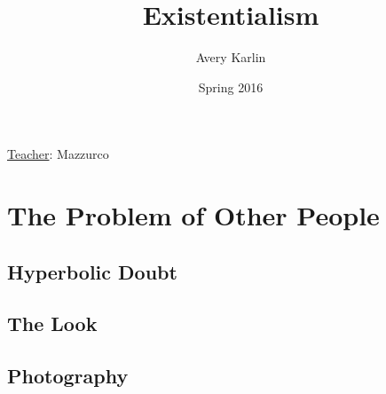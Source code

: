 \documentclass[11 pt, twoside]{article}
\newenvironment{outline*}
{
	\begin{outline}[enumerate]
	}
	{\end{outline}
}
\begin{document}
\title{Existentialism}
\author{Avery Karlin}
\date{Spring 2016}
\newcommand{\teacher}{Mazzurco}

\maketitle
\newpage
\hypertarget{content}{\tableofcontents}
\vspace{11pt}
\noindent
\underline{Teacher}: \teacher
\newpage

\section{The Problem of Other People}
\subsection{Hyperbolic Doubt}
\begin{outline*}
\1
\end{outline*}
\subsection{The Look}
\begin{outline*}
\1
\end{outline*}
\subsection{Photography}
\begin{outline*}
\1
\end{outline*}
\end{document}
